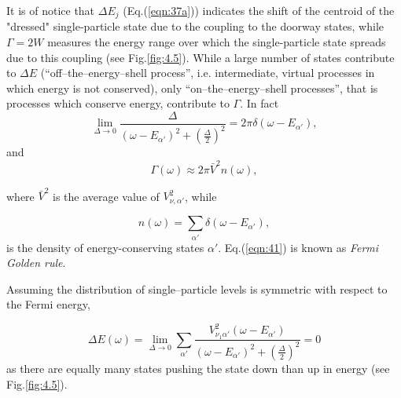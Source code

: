 It is of notice that $\Delta E_j$ (Eq.(\ref{eqn:37a})) indicates the shift  of the  centroid of the "dressed" single-particle state due to the coupling to the  doorway states, while $\Gamma = 2W$ measures the energy range over which the single-particle state spreads due to this coupling (see Fig.\ref{fig:4.5}). While a large number of states contribute to $\Delta E$ (``off--the--energy--shell process'', i.e. intermediate, virtual processes in which energy is not conserved), only ``on--the--energy--shell processes'', that is processes which conserve  energy, contribute to $\Gamma$. In fact
\begin{equation}
\nonumber
\lim_{\Delta \rightarrow 0} \frac{\Delta}{(\omega -E_{\alpha'})^2 + \left( \frac{\Delta}{2} \right)^2} = 2\pi\delta(\omega-E_{\alpha'}) ,
\end{equation}
and
\begin{equation}
\Gamma(\omega) \approx 2\pi \bar{V}^2 n(\omega) ,
\label{eqn:41}
\end{equation}

\noindent where $\bar{V}^2$ is the average value of $V_{\nu ,\alpha'}^2$, while

\begin{equation}
n(\omega) = \sum_{\alpha'} \delta(\omega - E_{\alpha'}) ,
\label{eqn:42}
\end{equation}
is the density of energy-conserving states $\alpha'$. Eq.(\ref{eqn:41}) is known as {\it Fermi Golden rule}.

Assuming the distribution of single--particle levels is symmetric with respect to the Fermi energy,

\begin{equation}
\Delta E(\omega) = \lim_{\Delta \rightarrow 0} \sum_{\alpha'} \frac{V_{\nu_1 \alpha'}^2 (\omega - E_{\alpha'})}{(\omega - E_{\alpha'})^2 + \left( \frac{\Delta}{2} \right)^2} = 0
\end{equation}
as there are equally many states pushing the state down than up in energy (see Fig.\ref{fig:4.5}).

